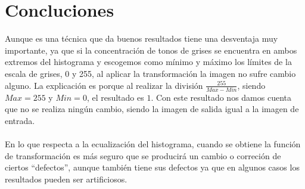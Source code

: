 \documentclass[conference]{IEEEtran}
\begin{document}
\section{Concluciones}
Aunque es una t\'ecnica que da buenos resultados tiene una desventaja muy importante, ya que si la concentraci\'on de tonos de grises se encuentra en ambos extremos del histograma y escogemos como m\'inimo y m\'aximo los l\'imites de la escala de grises, 0 y 255, al aplicar la transformaci\'on la imagen no sufre cambio alguno. La explicaci\'on  es porque al realizar la divisi\'on $\frac{255}{Max-Min}$, siendo $Max=255$ y $Min=0$, el resultado es $1$. Con este resultado nos damos cuenta que no se realiza ning\'un cambio, siendo la imagen de salida igual a la imagen de entrada.\\\\
En lo que respecta a la ecualizaci\'on del histograma, cuando se obtiene la funci\'on de transformaci\'on es m\'as seguro que se producir\'a un cambio o correci\'on de ciertos ``defectos'', aunque tambi\'en tiene sus defectos ya que en algunos casos los resultados pueden ser artificiosos.

\end{document}
